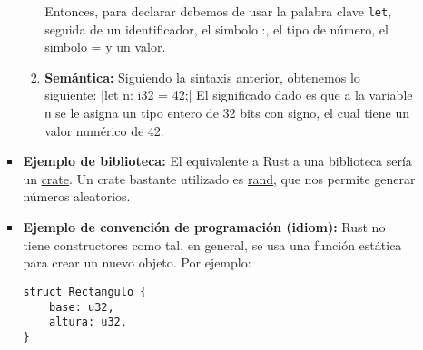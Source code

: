 \documentclass[11pt,letterpaper]{article}
\begin{document}
\begin{enumerate}
\begin{itemize}
\begin{itemize}
\begin{enumerate}
                                Entonces, para declarar debemos de usar la
                                palabra clave \texttt{let}, seguida de un
                                identificador, el simbolo :, el tipo de número,
                                el simbolo = y un valor.

                          \item \textbf{Semántica:} Siguiendo la sintaxis
                                anterior, obtenemos lo siguiente:
                                |let n: i32 = 42;|
                                El significado dado es que a la variable
                                \texttt{n} se le asigna un tipo entero de 32
                                bits con signo, el cual tiene un valor numérico
                                de 42.
                        \end{enumerate}

                  \item \textbf{Ejemplo de biblioteca:} El equivalente a Rust a
                        una biblioteca sería un
                        \href{https://doc.rust-lang.org/book/ch07-01-packages-and-crates.html}{crate}.
                        Un crate bastante utilizado es
                        \href{https://crates.io/crates/rand}{rand}, que nos
                        permite generar números aleatorios.

                  \item \textbf{Ejemplo de convención de programación (idiom):}
                        Rust no tiene constructores como tal, en general, se usa
                        una función estática para crear un nuevo objeto. Por
                        ejemplo:
\begin{verbatim}
struct Rectangulo {
    base: u32,
    altura: u32,
}


\end{verbatim}
\end{itemize}
\end{itemize}
\end{enumerate}
\end{document}
